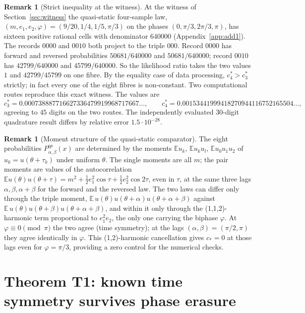 \documentclass[10pt]{article}
\theoremstyle{definition}
\newtheorem{remark}[theorem]{Remark}
\newcommand{\E}{\mathbb E}
\begin{document}
\begin{remark}[Strict inequality at the witness]
\label{rem:strict}
At the witness of Section~\ref{sec:witness} the quasi-static
four-sample law, $(m,e_1,e_2,\varphi)=(9/20,1/4,1/5,\pi/3)$ on the phases
$(0,\pi/3,2\pi/3,\pi)$, has sixteen positive rational cells with
denominator $640000$ (Appendix~\ref{app:add1}).  The records $0000$ and
$0010$ both project to the triple $000$.  Record $0000$ has forward and
reversed probabilities $50681/640000$ and $50681/640000$; record $0010$
has $42799/640000$ and $45799/640000$.  So the likelihood ratio takes the
two values $1$ and $42799/45799$ on one fibre.  By the equality case of data processing,
$c_4^*>c_3^*$ strictly; in fact every one of the eight fibres is
non-constant. Two computational routes reproduce this exact witness.  The values are
\[
c_3^*=0.000738887716627336479919968717667\ldots,\qquad
c_4^*=0.00153441999418270944116752165504\ldots,
\]
agreeing to $45$ digits on the two routes. The independently evaluated
30-digit quadrature result differs by relative error $1.5\cdot10^{-28}$.
\end{remark}

\begin{remark}[Moment structure of the quasi-static comparator]
\label{rem:moments}
The eight probabilities $P^{\mathrm{qs}}_{\alpha,\beta}(x)$ are determined by
the moments $\E u_k$, $\E u_ku_l$, $\E u_0u_1u_2$ of $u_k=u(\theta+\tau_k)$
under uniform $\theta$.  The single moments are all $m$; the pair moments
are values of the autocorrelation
$\E u(\theta)u(\theta+\tau)=m^2+\tfrac12e_1^2\cos\tau+\tfrac12e_2^2\cos2\tau$,
even in $\tau$, at the same three lags $\alpha,\beta,\alpha+\beta$ for the
forward and the reversed law.  The two laws can differ only through the
triple moment, $\E\,u(\theta)u(\theta+\alpha)u(\theta+\alpha+\beta)$
against $\E\,u(\theta)u(\theta+\beta)u(\theta+\alpha+\beta)$, and within
it only through the (1,1,2)-harmonic term proportional to $e_1^2e_2$, the
only one carrying the biphase $\varphi$.  At $\varphi\equiv0\pmod\pi$ the
two agree (time symmetry); at the lags $(\alpha,\beta)=(\pi/2,\pi)$ they
agree identically in $\varphi$. This (1,2)-harmonic cancellation gives
$c_*=0$ at those lags even for $\varphi=\pi/3$, providing a zero control
for the numerical checks.
\end{remark}

\section{Theorem T1: known time symmetry survives phase erasure}
\label{sec:T1}
\end{document}

